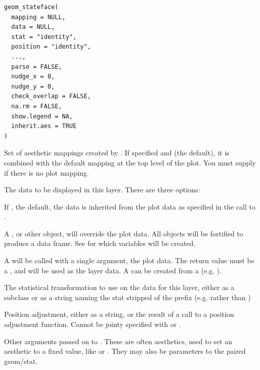 \documentclass[a4paper]{book}
\begin{document}
%
\begin{Usage}
\begin{verbatim}
geom_stateface(
  mapping = NULL,
  data = NULL,
  stat = "identity",
  position = "identity",
  ...,
  parse = FALSE,
  nudge_x = 0,
  nudge_y = 0,
  check_overlap = FALSE,
  na.rm = FALSE,
  show.legend = NA,
  inherit.aes = TRUE
)
\end{verbatim}
\end{Usage}
%
\begin{Arguments}
\begin{ldescription}
\item[\code{mapping}] Set of aesthetic mappings created by . If specified and
 (the default), it is combined with the default mapping
at the top level of the plot. You must supply  if there is no plot
mapping.

\item[\code{data}] The data to be displayed in this layer. There are three
options:

If , the default, the data is inherited from the plot
data as specified in the call to .

A , or other object, will override the plot
data. All objects will be fortified to produce a data frame. See
 for which variables will be created.

A  will be called with a single argument,
the plot data. The return value must be a , and
will be used as the layer data. A  can be created
from a  (e.g. ).

\item[\code{stat}] The statistical transformation to use on the data for this
layer, either as a   subclass or as a string naming the
stat stripped of the  prefix (e.g.  rather than
)

\item[\code{position}] Position adjustment, either as a string, or the result of
a call to a position adjustment function. Cannot be jointy specified with
 or .

\item[\code{...}] Other arguments passed on to . These are
often aesthetics, used to set an aesthetic to a fixed value, like
 or . They may also be parameters
to the paired geom/stat.


\end{ldescription}
\end{Arguments}
\end{document}

